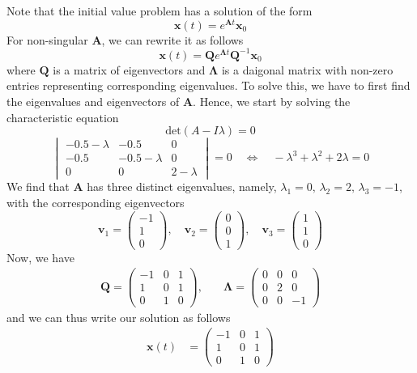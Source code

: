 \documentclass[12pt]{article}
\begin{document}
\begin{enumerate}
Note that the initial value problem has a solution of the form
\[
    \mathbf{x}(t) = e^{\mathbf{A}t} \mathbf{x}_{0}
\]
For non-singular $\mathbf{A}$, we can rewrite it as follows
$$\mathbf{x}(t)=\mathbf{Q}e^{\mathbf{\Lambda} t}\mathbf{Q}^{-1}\mathbf{x}_{0}$$
where $\mathbf{Q}$ is a matrix of eigenvectors and $\mathbf \Lambda$ is a daigonal matrix with non-zero entries representing corresponding eigenvalues.
To solve this, we have to first find the eigenvalues and eigenvectors of $\mathbf{A}$. 
Hence, we start by solving the characteristic equation
\[
    \text{det}\left(A - I\lambda\right) = 0
\]
\[
\begin{vmatrix} -0.5 - \lambda & -0.5 & 0\\ -0.5 & -0.5 - \lambda & 0\\ 0 & 0 & 2-\lambda \end{vmatrix}
    = 0 \quad \iff \quad -\lambda^{3} + \lambda^{2} + 2\lambda = 0
\]
We find that $\mathbf{A}$ has three distinct eigenvalues, namely, $\lambda_{1}=0, \, \lambda_{2}=2, \, \lambda_{3}=-1$, with 
the corresponding eigenvectors
\[
\mathbf{v}_{1}=\begin{pmatrix} -1\\ 1\\ 0 \end{pmatrix}, \quad \mathbf{v}_{2}=\begin{pmatrix} 0\\ 0\\ 1 \end{pmatrix}, \quad \mathbf{v}_{3}=\begin{pmatrix} 1\\ 1\\ 0 \end{pmatrix}
\]
Now, we have
\begin{align*}
    \mathbf{Q}=\begin{pmatrix} -1 & 0 & 1\\ 1 & 0 & 1\\ 0 & 1 & 0 \end{pmatrix}, & \quad \mathbf{\Lambda} = \begin{pmatrix} 0 & 0 & 0\\ 0 & 2 & 0\\ 0 & 0 & -1 \end{pmatrix}
\end{align*}
and we can thus write our solution as follows
\begin{align*}
\mathbf{x}(t) &= \begin{pmatrix} -1 & 0 & 1\\ 1 & 0 & 1\\ 0 & 1 & 0 \end{pmatrix}

\end{align*}
\end{enumerate}
\end{document}
